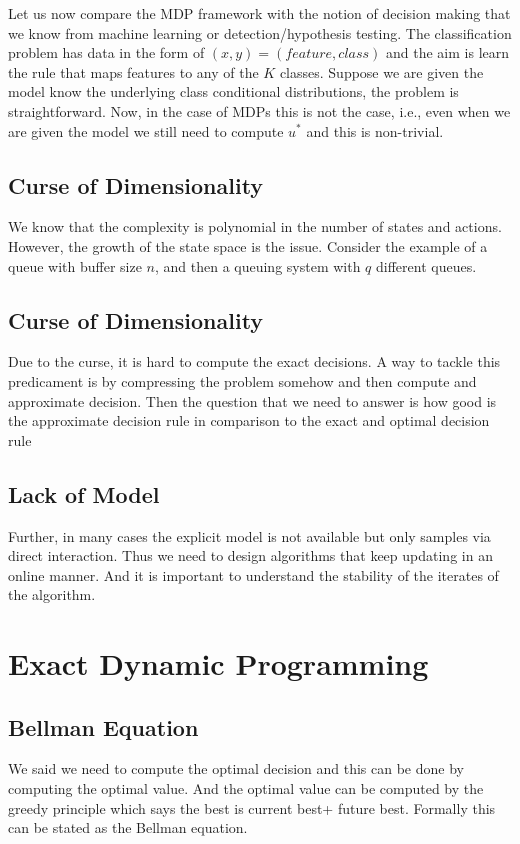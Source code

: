 \documentclass{article}
\begin{document}
Let us now compare the MDP framework with the notion of decision making that we know from machine learning or detection/hypothesis testing.
The classification problem has data in the form of $(x,y)=(feature,class)$ and the aim is learn the rule that maps features to any of the $K$ classes.
Suppose we are given the model know the underlying class conditional distributions, the problem is straightforward. Now, in the case of MDPs this is not the case, i.e., even when we are given the model we still need to compute $u^*$ and this is non-trivial.

\subsection{Curse of Dimensionality}
We know that the complexity is polynomial in the number of states and actions. However, the growth of the state space is the issue. Consider the example of a queue with buffer size $n$, and then a queuing system with $q$ different queues.
\subsection{Curse of Dimensionality}
Due to the curse, it is hard to compute the exact decisions. A way to tackle this predicament is by compressing the problem somehow and then compute and approximate decision. Then the question that we need to answer is how good is the approximate decision rule in comparison to the exact and optimal decision rule
\subsection{Lack of Model}
Further, in many cases the explicit model is not available but only samples via direct interaction. Thus we need to design algorithms that keep updating in an online manner.
And it is important to understand the stability of the iterates of the algorithm.


\section{Exact Dynamic Programming}
\subsection{Bellman Equation}
We said we need to compute the optimal decision and this can be done by computing the optimal value. And the optimal value can be computed by the greedy principle which says the best is current best+ future best. Formally this can be stated as the Bellman equation.
\end{document}

